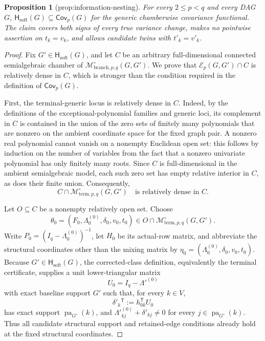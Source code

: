 \documentclass{article}
\newtheorem{proposition}{Proposition}
\begin{document}
\begin{proposition}[prop:information-nesting]\label{prop:information-nesting}
For every \(2\le p<q\) and every DAG \(G\), \(\mathsf H_{\mathrm{soft}}(G)\subseteq\mathsf{Cov}_p(G)\) for the generic chamberwise covariance functional. The claim covers both signs of every true variance change, makes no pointwise assertion on \(t_k=v_k\), and allows candidate twins with \(t'_k=v'_k\).
\end{proposition}
\begin{proof}
Fix \(G'\in\mathsf H_{\mathrm{soft}}(G)\), and let \(C\) be an arbitrary full-dimensional connected semialgebraic chamber of \(\mathcal M^{\circ}_{\mathrm{branch},p,q}(G,G')\).  We prove that \(\mathcal E_p(G,G')\cap C\) is relatively dense in \(C\), which is stronger than the condition required in the definition of \(\mathsf{Cov}_p(G)\).

First, the terminal-generic locus is relatively dense in \(C\).  Indeed, by the definitions of the exceptional-polynomial families and generic loci, its complement in \(C\) is contained in the union of the zero sets of finitely many polynomials that are nonzero on the ambient coordinate space for the fixed graph pair.  A nonzero real polynomial cannot vanish on a nonempty Euclidean open set: this follows by induction on the number of variables from the fact that a nonzero univariate polynomial has only finitely many roots.  Since \(C\) is full-dimensional in the ambient semialgebraic model, each such zero set has empty relative interior in \(C\), as does their finite union.  Consequently,
\[
 C\cap\mathcal M^{\circ}_{\mathrm{term},p,q}(G,G')
 \quad\text{is relatively dense in }C.
\]

Let \(O\subseteq C\) be a nonempty relatively open set.  Choose
\[
 \theta_0=(F_0,\Lambda^{(0)}_0,\delta_0,v_0,t_0)
 \in O\cap\mathcal M^{\circ}_{\mathrm{term},p,q}(G,G').
\]
Write \(P_0=(I_q-\Lambda^{(0)}_0)^{-1}\), let \(H_0\) be its actual-row matrix, and abbreviate the structural coordinates other than the mixing matrix by
\(
 \eta_0=(\Lambda^{(0)}_0,\delta_0,v_0,t_0).
\)
Because \(G'\in\mathsf H_{\mathrm{soft}}(G)\), the corrected-class definition, equivalently the terminal certificate, supplies a unit lower-triangular matrix
\[
 U_0=I_q-\Lambda'^{(0)}
\]
with exact baseline support \(G'\) such that, for every \(k\in V\),
\[
 \delta'_k{}^{\mathsf T}:=h_{0k}^{\mathsf T}U_0
\]
has exact support \(\operatorname{pa}_{G'}(k)\), and
\(
 \Lambda'^{(0)}_{kj}+\delta'_{kj}\ne0
\)
for every \(j\in\operatorname{pa}_{G'}(k)\).  Thus all candidate structural support and retained-edge conditions already hold at the fixed structural coordinates.


\end{proof}
\end{document}
